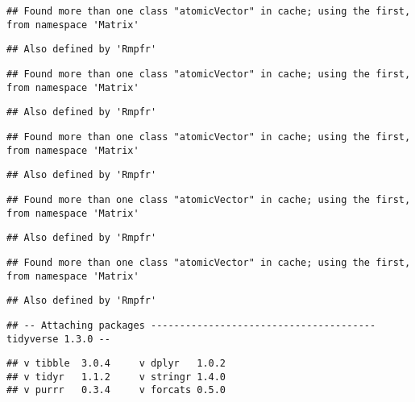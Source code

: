 \documentclass[
]{article}
\begin{document}
\begin{verbatim}
## Found more than one class "atomicVector" in cache; using the first, from namespace 'Matrix'
\end{verbatim}

\begin{verbatim}
## Also defined by 'Rmpfr'
\end{verbatim}

\begin{verbatim}
## Found more than one class "atomicVector" in cache; using the first, from namespace 'Matrix'
\end{verbatim}

\begin{verbatim}
## Also defined by 'Rmpfr'
\end{verbatim}

\begin{verbatim}
## Found more than one class "atomicVector" in cache; using the first, from namespace 'Matrix'
\end{verbatim}

\begin{verbatim}
## Also defined by 'Rmpfr'
\end{verbatim}

\begin{verbatim}
## Found more than one class "atomicVector" in cache; using the first, from namespace 'Matrix'
\end{verbatim}

\begin{verbatim}
## Also defined by 'Rmpfr'
\end{verbatim}

\begin{verbatim}
## Found more than one class "atomicVector" in cache; using the first, from namespace 'Matrix'
\end{verbatim}

\begin{verbatim}
## Also defined by 'Rmpfr'
\end{verbatim}

\begin{verbatim}
## -- Attaching packages --------------------------------------- tidyverse 1.3.0 --
\end{verbatim}

\begin{verbatim}
## v tibble  3.0.4     v dplyr   1.0.2
## v tidyr   1.1.2     v stringr 1.4.0
## v purrr   0.3.4     v forcats 0.5.0
\end{verbatim}
\end{document}
